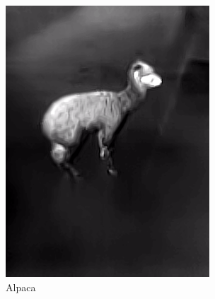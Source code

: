 \documentclass{l4proj}
\begin{document}
\begin{figure}[ht]
\begin{subfigure}[h!]{0.18\textwidth}
    \includegraphics[width=\textwidth, trim={0cm 1.6cm 0cm 1.6cm}, clip]{images/dataset/alpaca/lwir.png}
    \caption{Alpaca}
  \end{subfigure}
  \begin{subfigure}[h!]{0.18\textwidth}

\end{subfigure}
\end{figure}
\end{document}
